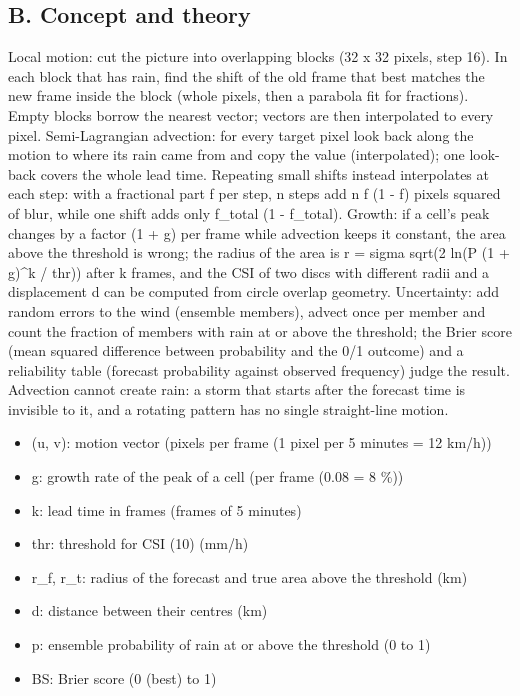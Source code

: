 \documentclass[11pt,a4paper]{article}
\begin{document}
\subsection*{B. Concept and theory}
Local motion: cut the picture into overlapping blocks (32 x 32 pixels, step 16). In each block that has rain, find the shift of the old frame that best matches the new frame inside the block (whole pixels, then a parabola fit for fractions). Empty blocks borrow the nearest vector; vectors are then interpolated to every pixel. Semi-Lagrangian advection: for every target pixel look back along the motion to where its rain came from and copy the value (interpolated); one look-back covers the whole lead time. Repeating small shifts instead interpolates at each step: with a fractional part f per step, n steps add n f (1 - f) pixels squared of blur, while one shift adds only f\_total (1 - f\_total). Growth: if a cell's peak changes by a factor (1 + g) per frame while advection keeps it constant, the area above the threshold is wrong; the radius of the area is r = sigma sqrt(2 ln(P (1 + g)\textasciicircum{}k / thr)) after k frames, and the CSI of two discs with different radii and a displacement d can be computed from circle overlap geometry. Uncertainty: add random errors to the wind (ensemble members), advect once per member and count the fraction of members with rain at or above the threshold; the Brier score (mean squared difference between probability and the 0/1 outcome) and a reliability table (forecast probability against observed frequency) judge the result. Advection cannot create rain: a storm that starts after the forecast time is invisible to it, and a rotating pattern has no single straight-line motion.

\begin{itemize}[nosep]
\item (u, v): motion vector (pixels per frame (1 pixel per 5 minutes = 12 km/h))
\item g: growth rate of the peak of a cell (per frame (0.08 = 8 \%))
\item k: lead time in frames (frames of 5 minutes)
\item thr: threshold for CSI (10) (mm/h)
\item r\_f, r\_t: radius of the forecast and true area above the threshold (km)
\item d: distance between their centres (km)
\item p: ensemble probability of rain at or above the threshold (0 to 1)
\item BS: Brier score (0 (best) to 1)
\end{itemize}
\end{document}
